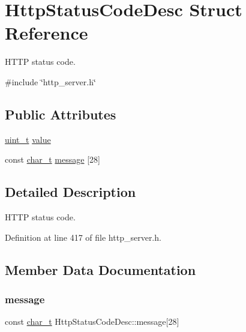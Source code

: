 \hypertarget{structHttpStatusCodeDesc}{}\section{Http\+Status\+Code\+Desc Struct Reference}
\label{structHttpStatusCodeDesc}


H\+T\+TP status code.  




{\ttfamily \#include \char`\"{}http\+\_\+server.\+h\char`\"{}}

\subsection*{Public Attributes}
\begin{DoxyCompactItemize}
\item 
\hyperlink{compiler__port_8h_a12a1e9b3ce141648783a82445d02b58d}{uint\+\_\+t} \hyperlink{structHttpStatusCodeDesc_adaf71beefc2347ea8482d13dbb9b199b}{value}
\item 
const \hyperlink{compiler__port_8h_a40bb5262bf908c328fbcfbe5d29d0201}{char\+\_\+t} \hyperlink{structHttpStatusCodeDesc_a5b4cb4ff1c8a9d52c4e8b5cb7f50582f}{message} \mbox{[}28\mbox{]}
\end{DoxyCompactItemize}


\subsection{Detailed Description}
H\+T\+TP status code. 

Definition at line 417 of file http\+\_\+server.\+h.



\subsection{Member Data Documentation}
\mbox{\label{structHttpStatusCodeDesc_a5b4cb4ff1c8a9d52c4e8b5cb7f50582f}} 
\subsubsection{\texorpdfstring{message}{message}}
{\footnotesize\ttfamily const \hyperlink{compiler__port_8h_a40bb5262bf908c328fbcfbe5d29d0201}{char\+\_\+t} Http\+Status\+Code\+Desc\+::message\mbox{[}28\mbox{]}}



